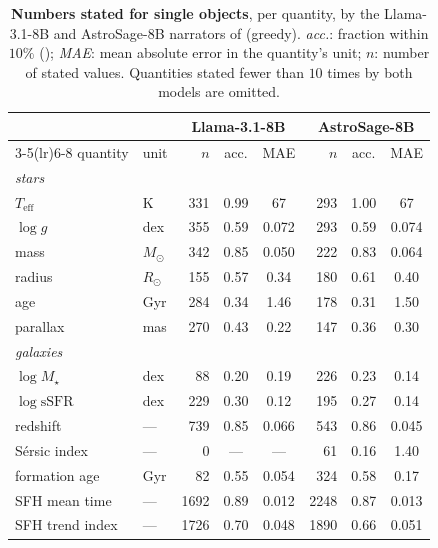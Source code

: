 \begin{table}[h]\centering\small
\caption{\textbf{Numbers stated for single objects}, per quantity, by the
Llama-3.1-8B and AstroSage-8B narrators of  (greedy).
\emph{acc.}: fraction within $10\%$ (); \emph{MAE}: mean
absolute error in the quantity's unit; $n$: number of stated values. Quantities
stated fewer than $10$ times by both models are omitted.}
\label{tab:tol}
\begin{tabular}{llrccrcc}
\toprule
 & & \multicolumn{3}{c}{Llama-3.1-8B} & \multicolumn{3}{c}{AstroSage-8B} \\
\cmidrule(lr){3-5}\cmidrule(lr){6-8}
quantity & unit & $n$ & acc. & MAE & $n$ & acc. & MAE \\
\midrule
\multicolumn{8}{l}{\emph{stars}}\\
$T_\mathrm{eff}$ & K           & 331 & 0.99 & 67    & 293 & 1.00 & 67    \\
$\log g$         & dex         & 355 & 0.59 & 0.072 & 293 & 0.59 & 0.074 \\
mass             & $M_\odot$   & 342 & 0.85 & 0.050 & 222 & 0.83 & 0.064 \\
radius           & $R_\odot$   & 155 & 0.57 & 0.34  & 180 & 0.61 & 0.40  \\
age              & Gyr         & 284 & 0.34 & 1.46  & 178 & 0.31 & 1.50  \\
parallax         & mas         & 270 & 0.43 & 0.22  & 147 & 0.36 & 0.30  \\
\midrule
\multicolumn{8}{l}{\emph{galaxies}}\\
$\log M_\star$          & dex & 88   & 0.20 & 0.19  & 226  & 0.23 & 0.14  \\
$\log \mathrm{sSFR}$    & dex & 229  & 0.30 & 0.12  & 195  & 0.27 & 0.14  \\
redshift                & --- & 739  & 0.85 & 0.066 & 543  & 0.86 & 0.045 \\
S\'ersic index          & --- & 0    & ---  & ---   & 61   & 0.16 & 1.40  \\
formation age           & Gyr & 82   & 0.55 & 0.054 & 324  & 0.58 & 0.17  \\
SFH mean time           & --- & 1692 & 0.89 & 0.012 & 2248 & 0.87 & 0.013 \\
SFH trend index         & --- & 1726 & 0.70 & 0.048 & 1890 & 0.66 & 0.051 \\
\bottomrule
\end{tabular}
\end{table}

